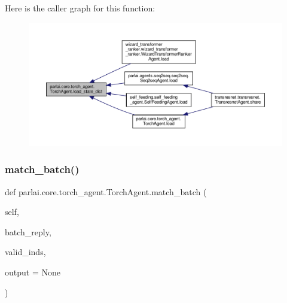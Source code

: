 Here is the caller graph for this function\+:
\nopagebreak
\begin{figure}[H]
\begin{center}
\leavevmode
\includegraphics[width=350pt]{classparlai_1_1core_1_1torch__agent_1_1TorchAgent_a5dcfca62a677f8de97f09ce993258f84_icgraph}
\end{center}
\end{figure}
\mbox{\label{classparlai_1_1core_1_1torch__agent_1_1TorchAgent_aba56b961d929e5c5b5da9cf8bd331502}} 
\subsubsection{\texorpdfstring{match\+\_\+batch()}{match\_batch()}}
{\footnotesize\ttfamily def parlai.\+core.\+torch\+\_\+agent.\+Torch\+Agent.\+match\+\_\+batch (\begin{DoxyParamCaption}\item[{}]{self,  }\item[{}]{batch\+\_\+reply,  }\item[{}]{valid\+\_\+inds,  }\item[{}]{output = {\ttfamily None} }\end{DoxyParamCaption})}

